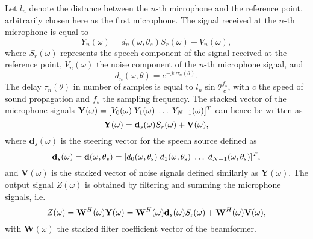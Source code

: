 \documentclass[9pt]{article}
\begin{document}
Let $l_{n}$ denote the distance between the $n$-th microphone and the reference point, arbitrarily chosen here as the first microphone. The signal received at the $n$-th microphone is equal to
\begin{equation*}
Y_{n}(\omega) = d_{n}(\omega,\theta_s)S_{r}(\omega) + V_{n}(\omega),
\end{equation*}
where $S_{r}(\omega)$ represents the speech component of the signal received at the reference point, $V_{n}(\omega)$ the noise component of the $n$-th microphone signal, and
\begin{equation}
\label{eq: steer}
d_{n}(\omega,\theta) = e^{-j \omega \tau_{n}(\theta)}.
\end{equation}
The delay $\tau_{n}(\theta)$ in number of samples is equal to $l_{n} \sin \theta \frac{f_{s}}{c}$, with $c$ the speed of sound propagation and $f_{s}$ the sampling frequency. The stacked vector of the microphone signals ${\bf{Y}}(\omega) = [Y_{0}(\omega) \; Y_{1}(\omega) \; \ldots \; Y_{N-1}(\omega)]^{T}$ can hence be written as
\begin{equation*}
\mathbf{Y}(\omega) = {\mathbf{d}}_{s}(\omega) S_{r}(\omega) + {\bf{V}}(\omega),
\end{equation*}
where $\mathbf{d}_s(\omega)$ is the steering vector for the speech source defined as
\begin{equation*}
\mathbf{d}_{s}(\omega) = \mathbf{d}(\omega,\theta_{s}) = [d_{0}(\omega,\theta_{\rm s}) \; d_{1}(\omega,\theta_{\rm s}) \; \ldots \; d_{N-1}(\omega,\theta_{\rm s}) ]^{T},
\end{equation*}
and $\mathbf{V}(\omega)$ is the stacked vector of noise signals defined similarly as $\mathbf{Y}(\omega)$. 
The output signal $Z(\omega)$ is obtained by filtering and summing the microphone signals, i.e.
\begin{equation*}
Z(\omega) =  \mathbf{W}^{H}(\omega) \mathbf{Y}(\omega) = \mathbf{W}^{H}(\omega) \mathbf{d}_{s}(\omega) S_{\rm r}(\omega) + \mathbf{W}^{H}(\omega)\mathbf{V}(\omega),
\end{equation*}
with $\mathbf{W}(\omega)$ the stacked filter coefficient vector of the beamformer. 
\end{document}
